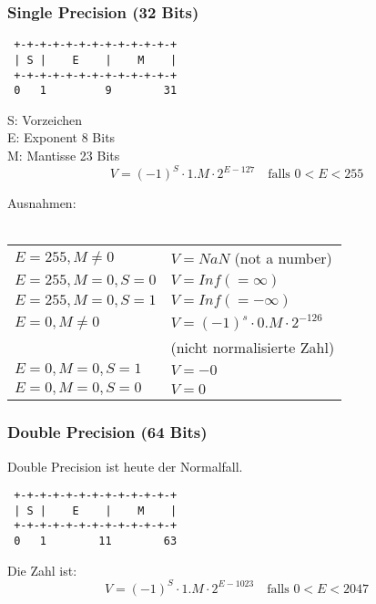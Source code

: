 \documentclass[german, 10pt, a4paper, twocolumn]{scrartcl}
\theoremstyle{definition}
\begin{document}
\subsubsection{Single Precision (32 Bits)}

\scriptsize
\begin{verbatim}
 +-+-+-+-+-+-+-+-+-+-+-+-+
 | S |    E    |    M    |
 +-+-+-+-+-+-+-+-+-+-+-+-+
 0   1         9        31
\end{verbatim}
\normalsize

S: Vorzeichen\\
E: Exponent 8 Bits\\
M: Mantisse 23 Bits\\

\begin{displaymath}
	V = (-1)^S \cdotp 1.M \cdotp 2^{E-127} \quad \mbox{falls } 0 < E < 255
\end{displaymath}

Ausnahmen:\\\\
\begin{tabular}{l l}
	$E=255, M\neq 0$ &		$V=NaN$ (not a number)\\
	$E=255, M=0, S=0$ &		$V=Inf (=\infty)$\\
	$E=255, M=0, S=1$ &		$V=Inf (=-\infty)$\\
	$E=0, M\neq 0$ &		$V=(-1)^{s}\cdotp 0.M\cdotp 2^{-126}$\\
	&				(nicht normalisierte Zahl)\\
	$E=0, M=0, S=1$ &		$V=-0$\\
	$E=0, M=0, S=0$ &		$V=0$
\end{tabular}

\subsubsection{Double Precision (64 Bits)}

Double Precision ist heute der Normalfall.

\scriptsize
\begin{verbatim}
 +-+-+-+-+-+-+-+-+-+-+-+-+
 | S |    E    |    M    |
 +-+-+-+-+-+-+-+-+-+-+-+-+
 0   1        11        63
\end{verbatim}
\normalsize

Die Zahl ist:
\begin{displaymath}
	V = (-1)^S \cdotp 1.M \cdotp 2^{E-1023} \quad \mbox{falls } 0 < E < 2047
\end{displaymath}
\end{document}

